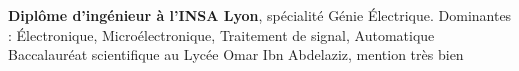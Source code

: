 %
%
%


\begin{scholarship}
					{\textbf{Diplôme d'ingénieur à l'INSA Lyon}, spécialité Génie Électrique.
					Dominantes : Électronique, Microélectronique, Traitement de signal, Automatique}
					{Baccalauréat scientifique au Lycée Omar Ibn Abdelaziz, mention très bien}
\end{scholarship}
